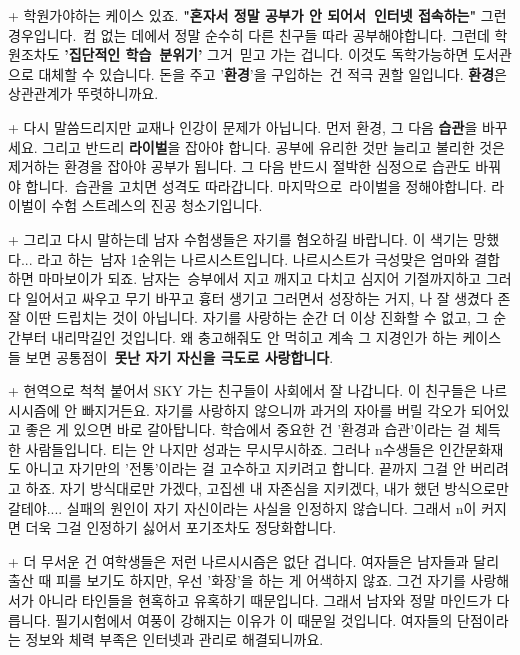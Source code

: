 + 학원가야하는 케이스 있죠.
\textbf{"혼자서 정말 공부가 안 되어서 인터넷 접속하는"} 그런 경우입니다. 컴 없는 데에서 정말 순수히 다른 친구들 따라 공부해야합니다.
그런데 학원조차도 \textbf{'집단적인 학습 분위기'} 그거 믿고 가는 겁니다.
이것도 독학가능하면 도서관으로 대체할 수 있습니다.
돈을 주고 '\textbf{환경}'을 구입하는 건 적극 권할 일입니다. \textbf{환경}은 상관관계가 뚜렷하니까요.
\vspace{5mm}

+ 다시 말씀드리지만 교재나 인강이 문제가 아닙니다.
먼저 환경, 그 다음 \textbf{습관}을 바꾸세요. 그리고 반드리 \textbf{라이벌}을 잡아야 합니다.
공부에 유리한 것만 늘리고 불리한 것은 제거하는 환경을 잡아야 공부가 됩니다.
그 다음 반드시 절박한 심정으로 습관도 바꿔야 합니다. 습관을 고치면 성격도 따라갑니다.
마지막으로 라이벌을 정해야합니다. 라이벌이 수험 스트레스의 진공 청소기입니다.
\vspace{5mm}

+ 그리고 다시 말하는데 남자 수험생들은 자기를 혐오하길 바랍니다.
이 색기는 망했다... 라고 하는 남자 1순위는 나르시스트입니다. 나르시스트가 극성맞은 엄마와 결합하면 마마보이가 되죠.
남자는 승부에서 지고 깨지고 다치고 심지어 기절까지하고 그러다 일어서고 싸우고 무기 바꾸고 흉터 생기고 그러면서 성장하는 거지,
나 잘 생겼다 존잘 이딴 드립치는 것이 아닙니다. 자기를 사랑하는 순간 더 이상 진화할 수 없고, 그 순간부터 내리막길인 것입니다.
왜 충고해줘도 안 먹히고 계속 그 지경인가 하는 케이스들 보면 공통점이 \textbf{못난 자기 자신을 극도로 사랑합니다}.
\vspace{5mm}

+ 현역으로 척척 붙어서 SKY 가는 친구들이 사회에서 잘 나갑니다.
이 친구들은 나르시시즘에 안 빠지거든요. 자기를 사랑하지 않으니까 과거의 자아를 버릴 각오가 되어있고 좋은 게 있으면 바로 갈아탑니다.
학습에서 중요한 건 '환경과 습관'이라는 걸 체득한 사람들입니다. 티는 안 나지만 성과는 무시무시하죠.
그러나 n수생들은 인간문화재도 아니고 자기만의 '전통'이라는 걸 고수하고 지키려고 합니다. 끝까지 그걸 안 버리려고 하죠.
자기 방식대로만 가겠다, 고집센 내 자존심을 지키겠다, 내가 했던 방식으로만 갈테야....
실패의 원인이 자기 자신이라는 사실을 인정하지 않습니다. 그래서 n이 커지면 더욱 그걸 인정하기 싫어서 포기조차도 정당화합니다.
\vspace{5mm}

+ 더 무서운 건 여학생들은 저런 나르시시즘은 없단 겁니다.
여자들은 남자들과 달리 출산 때 피를 보기도 하지만, 우선 '화장'을 하는 게 어색하지 않죠.
그건 자기를 사랑해서가 아니라 타인들을 현혹하고 유혹하기 때문입니다. 그래서 남자와 정말 마인드가 다릅니다.
필기시험에서 여풍이 강해지는 이유가 이 때문일 것입니다. 여자들의 단점이라는 정보와 체력 부족은 인터넷과 관리로 해결되니까요.
\vspace{5mm}




